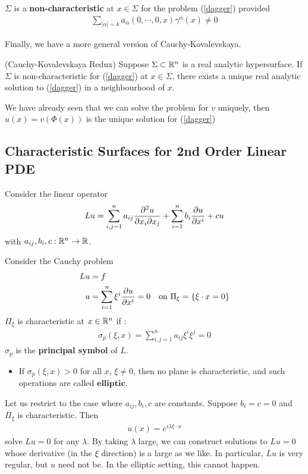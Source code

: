 \documentclass[12pt,a4paper]{report}
\newenvironment{proof}
{\begin{changemargin}{1cm}{0.5cm} 
	}%
	{\end{changemargin}
}
\begin{document}
 $\Sigma$ is a \textbf{non-characteristic} at $x\in \Sigma$ for the problem (\ref{dagger}) provided
\begin{align*}
\sum_{|\alpha| =k} a_{\alpha} (0,\cdots,0,x) \gamma^{\alpha}(x) \neq 0
\end{align*}
\s

Finally, we have a more general version of Cauchy-Kovalevskaya.
\s

\thm (Cauchy-Kovalevskaya Redux) Suppose $\Sigma \subset \mathbb{R}^n$ is a real analytic hypersurface. If $\Sigma$ is non-characteristic for (\ref{dagger}) at $x\in \Sigma$, there exists a unique real analytic solution to (\ref{dagger}) in a neighbourhood of $x$.
\begin{proof}
\pf We have already seen that we can solve the problem for $v$ uniquely, then $u(x)  = v(\Phi(x))$ is the unique solution for (\ref{dagger})

\eop
\end{proof}
\s

\subsection*{Characteristic Surfaces for 2nd Order Linear PDE}

Consider the linear operator
\begin{align*}
Lu = \sum_{i,j=1}^n a_{ij}\frac{\partial^2 u}{\partial x_i \partial x_j} + \sum_{i=1}^n b_i \frac{\partial u}{\partial x^i} + cu
\end{align*}
with $a_{ij},b_i,c : \mathbb{R}^n \rightarrow \mathbb{R}$.
\s

Consider the Cauchy problem
\begin{align*}
Lu& = f \\
u &= \sum_{i=1}^n \xi^i \frac{\partial u}{\partial x^i} = 0 \quad \text{on } \Pi_{\xi} = \{ \xi \cdot x =0 \}
\end{align*}
$\Pi_{\xi}$ is characteristic at $x\in \mathbb{R}^n$ if : 
\begin{align*}
\sigma_p (\xi, x) = \sum_{i,j=1}^n a_{ij}\xi^i \xi^j = 0
\end{align*}
$\sigma_p$ is the \textbf{principal symbol} of $L$. 
\s

\begin{itemize}
\item If $\sigma_p(\xi, x) >0$ for all $x$, $\xi \neq 0$, then no plane is characteristic, and such operations are called $\textbf{elliptic}$. 
\end{itemize}
\s

Let us restrict to the case where $a_{ij},b_i, c$ are constants. Suppose $b_i = c=0$ and $\Pi_{\xi}$ is characteristic. Then
\begin{align*}
u(x) = e^{i\lambda \xi \cdot x}
\end{align*}
solve $Lu =0$ for any $\lambda$. By taking $\lambda$ large, we can construct solutions to $Lu =0$ whose derivative (in the $\xi$ direction) is a large as we like. In particular, $Lu$ is very regular, but $u$ need not be. In the elliptic setting, this cannot happen. 
\s
\end{document}
